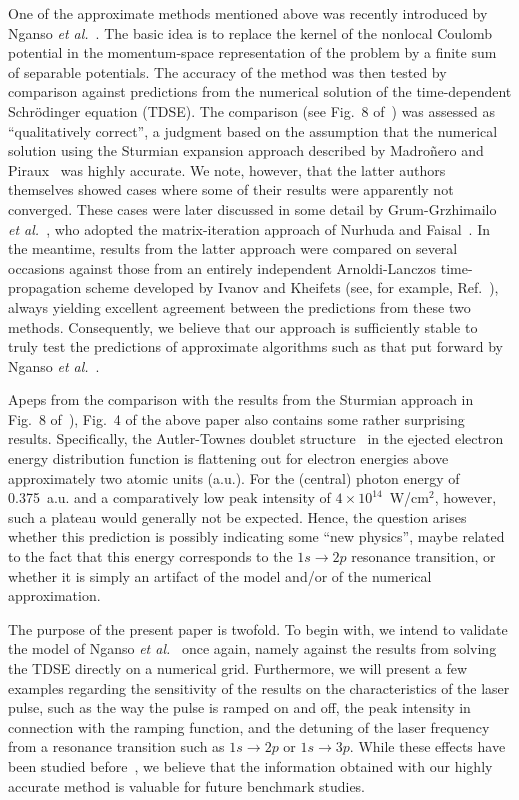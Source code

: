 \documentclass[12pt, aps,pra,amsmath,amssymb,showpacs,twocolumn,preprintnumbers,
floatfix,letterpaper]{revtex4-1}
\begin{document}
One of the approximate methods mentioned above was recently introduced by Nganso {\it et al.}~\cite{PhysRevA.83.013401}. The basic idea is to replace the kernel of the non\-local Coulomb potential in the momentum-space representation of the problem by a finite sum of separable potentials. The accuracy of the method was then tested by comparison against predictions from the numerical solution of the time-dependent Schr\"odinger equation (TDSE). The comparison (see Fig.~8 of~\cite{PhysRevA.83.013401}) was assessed as ``qualitatively correct'', a judgment based on the assumption that the numerical solution using the Sturmian expansion approach described by Madro\~nero and Piraux~\cite{PhysRevA.80.033409} was highly accurate. We note, however, that the latter authors themselves showed cases where some of their results were apparently not converged. These cases were later discussed in some detail by Grum-Grzhimailo {\it et al.}~\cite{PhysRevA.81.043408}, who adopted the matrix-iteration approach of Nurhuda and Faisal~\cite{PhysRevA.60.3125}. In the meantime, results from the latter approach were compared on several occasions against those from an entirely independent Arnoldi-Lanczos time-propagation scheme developed by Ivanov and Kheifets (see, for example, Ref.~\cite{Pullen:11}), always yielding excellent agreement between the predictions from these two methods. Consequently, we believe that our approach is sufficiently stable to truly test the predictions of approximate algorithms such as that put forward by Nganso {\it et al.}~\cite{PhysRevA.83.013401}.

Apeps from the comparison with the results from the Sturmian approach in Fig.~8 of~\cite{PhysRevA.83.013401}), Fig.~4 of the above paper also contains some rather surprising results. Specifically, the Autler-Townes doublet structure~\cite{PhysRev.100.703} in the ejected electron energy distribution function is flattening out for electron energies above approximately two atomic units (a.u.). For the (central) photon energy of 0.375~a.u. and a comparatively low peak intensity of $4 \times 10^{14}$~W/cm$^2$, however, such a plateau would generally not be expected. Hence, the question arises whether this prediction is possibly indicating some ``new physics'', maybe related to the fact that this energy corresponds to the $1s \to 2p$ resonance transition, or whether it is simply an artifact of the model and/or of the numerical approximation. 

The purpose of the present paper is two\-fold. To begin with, we intend to validate the model of Nganso {\it et al.}~\cite{PhysRevA.83.013401} once again, namely against the results from solving the TDSE directly on a numerical grid. Furthermore, we will present a few examples regarding the sensitivity of the results on the characteristics of the laser pulse, such as the way the pulse is ramped on and off, the peak intensity in connection with the ramping function, and the detuning of the laser frequency from a resonance transition such as $1s \to 2p$ or $1s \to 3p$. While these effects have been studied before~\cite{otherpapers}, we believe that the information obtained with our highly accurate method is valuable for future benchmark studies.
\end{document}
